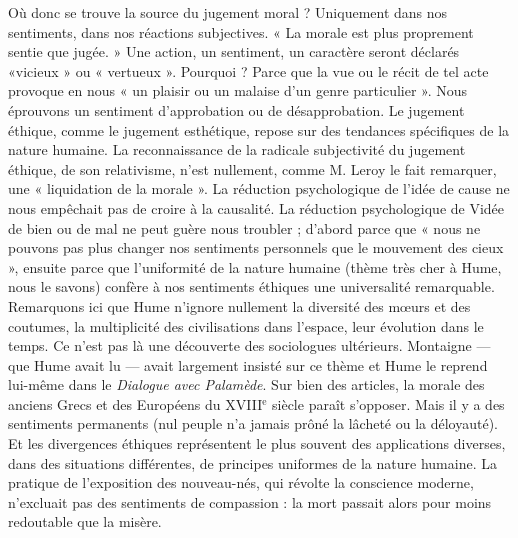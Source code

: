 Où donc se trouve la source du jugement moral ?
Uniquement dans nos sentiments, dans nos réactions subjectives. 
« La morale est plus proprement sentie que jugée. »
Une action, un sentiment, un caractère seront déclarés
«vicieux » ou « vertueux ». Pourquoi ? Parce que la vue
ou le récit de tel acte provoque en nous « un plaisir ou un
malaise d’un genre particulier ». Nous éprouvons un sentiment 
d’approbation ou de désapprobation. Le jugement
éthique, comme le jugement esthétique, repose sur des
tendances spécifiques de la nature humaine. La reconnaissance 
de la radicale subjectivité du jugement éthique, de
son relativisme, n’est nullement, comme M. Leroy le
fait remarquer, une « liquidation de la morale ». La réduction 
psychologique de l’idée de cause ne nous empêchait
pas de croire à la causalité. La réduction psychologique de
Vidée de bien ou de mal ne peut guère nous troubler ;
d’abord parce que « nous ne pouvons pas plus changer nos
sentiments personnels que le mouvement des cieux »,
ensuite parce que l’uniformité de la nature humaine
(thème très cher à Hume, nous le savons) confère à nos
sentiments éthiques une universalité remarquable. Remarquons 
ici que Hume n’ignore nullement la diversité des
mœurs et des coutumes, la multiplicité des civilisations
dans l’espace, leur évolution dans le temps. Ce n’est
pas là une découverte des sociologues ultérieurs. Montaigne — que 
Hume avait lu — avait largement insisté
sur ce thème et Hume le reprend lui-même dans le {\it Dialogue
avec Palamède}. Sur bien des articles, la morale des anciens
Grecs et des Européens du {\footnotesize XVIII}$^\text{e}$ siècle paraît s’opposer.
Mais il y a des sentiments permanents (nul peuple n’a
jamais prôné la lâcheté ou la déloyauté). Et les divergences
éthiques représentent le plus souvent des applications
diverses, dans des situations différentes, de principes
uniformes de la nature humaine. La pratique de l’exposition 
des nouveau-nés, qui révolte la conscience moderne,
n’excluait pas des sentiments de compassion : la mort
passait alors pour moins redoutable que la misère.

